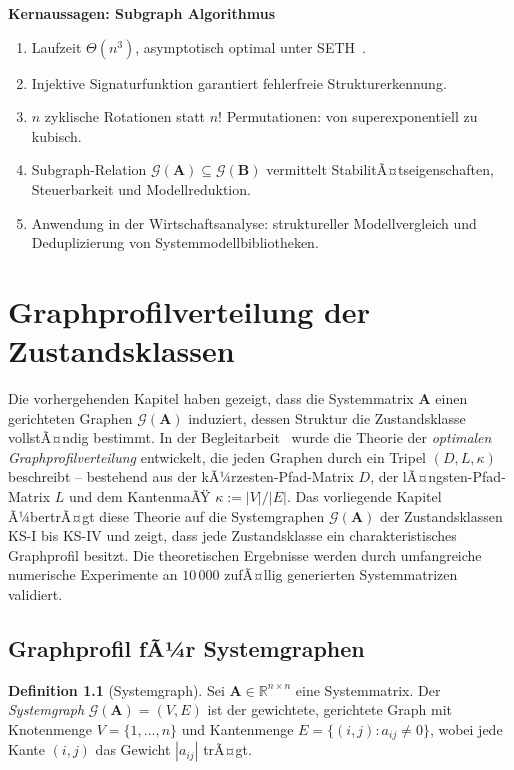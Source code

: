 ﻿\documentclass[12pt, a4paper, titlepage]{report}
\theoremstyle{definition}
\newtheorem{definition}[theorem]{Definition}
\theoremstyle{remark}
\newcommand{\R}{\mathbb{R}}
\newcommand{\vA}{\bm{A}}
\newcommand{\vB}{\bm{B}}
\begin{document}
\textbf{Kernaussagen: Subgraph Algorithmus}
\begin{enumerate}[label=(\roman*)]
  \item Laufzeit $\Theta(n^3)$, asymptotisch optimal unter SETH~\citep{epp2026subgraph}.
  \item Injektive Signaturfunktion garantiert fehlerfreie Strukturerkennung.
  \item $n$ zyklische Rotationen statt $n!$ Permutationen: von superexponentiell zu kubisch.
  \item Subgraph-Relation $\mathcal{G}(\vA) \subseteq \mathcal{G}(\vB)$ vermittelt
    StabilitÃ¤tseigenschaften, Steuerbarkeit und Modellreduktion.
  \item Anwendung in der Wirtschaftsanalyse: struktureller Modellvergleich und
    Deduplizierung von Systemmodellbibliotheken.
\end{enumerate}

\chapter{Graphprofilverteilung der Zustandsklassen}
\label{sec:graphprofil}

Die vorhergehenden Kapitel haben gezeigt, dass die Systemmatrix $\vA$ einen
gerichteten Graphen $\mathcal{G}(\vA)$ induziert, dessen Struktur die Zustandsklasse
vollstÃ¤ndig bestimmt. In der Begleitarbeit~\citep{epp2026graphs} wurde die Theorie der
\emph{optimalen Graphprofilverteilung} entwickelt, die jeden Graphen durch ein
Tripel $(D, L, \kappa)$ beschreibt -- bestehend aus der kÃ¼rzesten-Pfad-Matrix $D$,
der lÃ¤ngsten-Pfad-Matrix $L$ und dem KantenmaÃŸ $\kappa := |V|/|E|$.
Das vorliegende Kapitel Ã¼bertrÃ¤gt diese Theorie auf die Systemgraphen
$\mathcal{G}(\vA)$ der Zustandsklassen KS-I bis KS-IV und zeigt, dass jede
Zustandsklasse ein charakteristisches Graphprofil besitzt. Die theoretischen
Ergebnisse werden durch umfangreiche numerische Experimente an $10\,000$ zufÃ¤llig
generierten Systemmatrizen validiert.

\section{Graphprofil fÃ¼r Systemgraphen}

\begin{definition}[Systemgraph]
\label{def:systemgraph_gpv}
Sei $\vA \in \R^{n \times n}$ eine Systemmatrix. Der \emph{Systemgraph}
$\mathcal{G}(\vA) = (V, E)$ ist der gewichtete, gerichtete Graph mit
Knotenmenge $V = \{1, \ldots, n\}$ und Kantenmenge
$E = \{(i,j) : a_{ij} \neq 0\}$,
wobei jede Kante $(i,j)$ das Gewicht $|a_{ij}|$ trÃ¤gt.
\end{definition}
\end{document}
